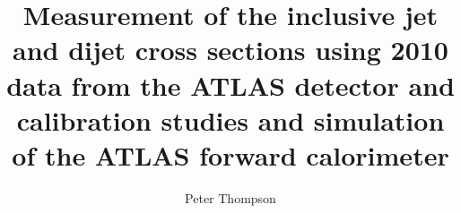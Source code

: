 
\author{Peter Thompson}
\title{Measurement of the inclusive jet and dijet cross sections using 2010 data from the ATLAS detector and calibration studies and simulation of the ATLAS forward calorimeter}



%
\setcounter{tocdepth}{2}
\setcounter{secnumdepth}{3}



